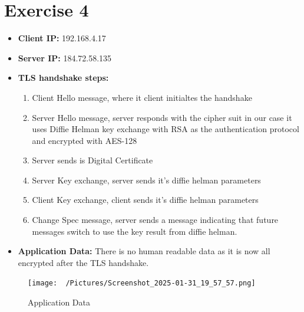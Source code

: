 \documentclass{article}
\numberwithin{equation}{subsection}
\begin{document}
	\newpage
	\section{Exercise 4}
	\begin{itemize}
		\item \textbf{Client IP:} 192.168.4.17
		\item \textbf{Server IP:} 184.72.58.135
		\item \textbf{TLS handshake steps:}
			\begin{enumerate}
				\item Client Hello message, where it client initialtes the handshake
				\item Server Hello message, server responds with the cipher suit in our case it uses Diffie
					Helman key exchange with RSA as the authentication protocol and encrypted with AES-128
				\item Server sends is Digital Certificate
				\item Server Key exchange, server sends it's diffie helman parameters
				\item Client Key exchange, client sends it's diffie helman parameters
				\item Change Spec message, server sends a message indicating that future
					messages switch to use the key result from diffie helman.
			\end{enumerate}

		\item \textbf{Application Data:} There is no human readable data as it is now
			all encrypted after the TLS handshake.
	\end{itemize}

	\begin{figure}[H]
		\caption{Application Data}	
		\texttt{[image: ~/Pictures/Screenshot\_2025-01-31\_19\_57\_57.png]}
	\end{figure}
\end{document}
